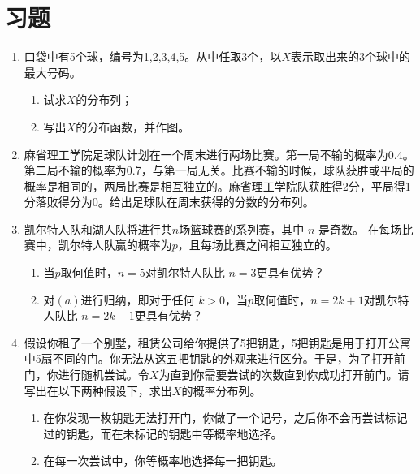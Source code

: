 \section{习题}

    \begin{enumerate}
        \item 口袋中有5个球，编号为1,2,3,4,5。从中任取3个，以$X$表示取出来的3个球中的最大号码。
        \begin{enumerate}
            \item 试求$X$的分布列；
            \item 写出$X$的分布函数，并作图。
        \end{enumerate}



\item 麻省理工学院足球队计划在一个周末进行两场比赛。第一局不输的概率为0.4。第二局不输的概率为0.7，与第一局无关。比赛不输的时候，球队获胜或平局的概率是相同的，两局比赛是相互独立的。麻省理工学院队获胜得2分，平局得1分落败得分为0。给出足球队在周末获得的分数的分布列。

\item 凯尔特人队和湖人队将进行共$n$场篮球赛的系列赛，其中 $n$ 是奇数。 在每场比赛中，凯尔特人队赢的概率为$p$，且每场比赛之间相互独立的。
\begin{enumerate}
    \item 当$p$取何值时，$n = 5$对凯尔特人队比 $n = 3$更具有优势？ 
    \item 
对$(a)$进行归纳，即对于任何 $k > 0$，当$p$取何值时，$n = 2k+1$对凯尔特人队比 $n = 2k-1$更具有优势？
\end{enumerate}

\item  假设你租了一个别墅，租赁公司给你提供了5把钥匙，5把钥匙是用于打开公寓中5扇不同的门。你无法从这五把钥匙的外观来进行区分。于是，为了打开前门，你进行随机尝试。令$X$为直到你需要尝试的次数直到你成功打开前门。请写出在以下两种假设下，求出$X$的概率分布列。
\begin{enumerate}
    \item 在你发现一枚钥匙无法打开门，你做了一个记号，之后你不会再尝试标记过的钥匙，而在未标记的钥匙中等概率地选择。
    \item 在每一次尝试中，你等概率地选择每一把钥匙。
\end{enumerate}
    \end{enumerate}

